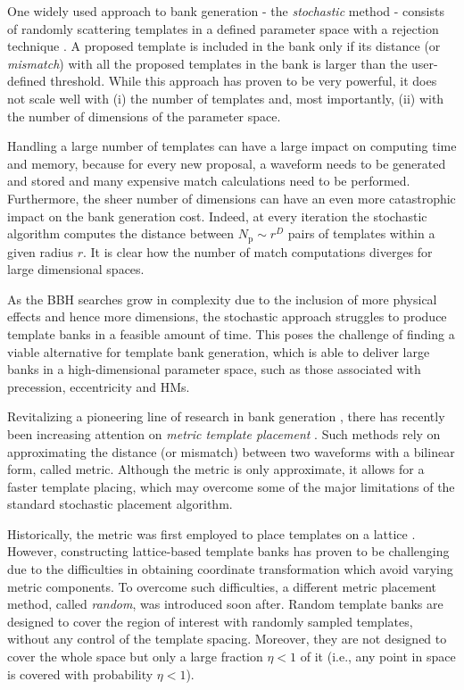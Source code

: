 \documentclass[twocolumn,showpacs,preprintnumbers,nofootinbib,prd,
superscriptaddress,10pt]{revtex4-2}
\begin{document}
One widely used approach to bank generation - the {\it stochastic} method \cite{Harry:2009ea, PhysRevD.80.104014, Ajith:2012mn} - consists of randomly scattering templates in a defined parameter space with a rejection technique \cite{DalCanton:2017ala, Mukherjee:2018yra, Indik:2016qky, Lenon:2021zac}. A proposed template is included in the bank only if its distance (or {\it mismatch}) with all the proposed templates in the bank is larger than the user-defined threshold.
While this approach has proven to be very powerful, it does not scale well with (i) the number of templates and, most importantly, (ii) with the number of dimensions of the parameter space.

Handling a large number of templates can have a large impact on computing time and memory, because for every new proposal, a waveform needs to be generated and stored and many expensive match calculations need to be performed.
Furthermore, the sheer number of dimensions can have an even more catastrophic impact on the bank generation cost. Indeed, at every iteration the stochastic algorithm computes the distance between $N_\text{p}\sim r^D$ pairs of templates within a given radius $r$. It is clear how the number of match computations diverges for large dimensional spaces.

As the BBH searches grow in complexity due to the inclusion of more physical effects and hence more dimensions, the stochastic approach struggles to produce template banks in a feasible amount of time.
This poses the challenge of finding a viable alternative for template bank generation, which is able to deliver large banks in a high-dimensional parameter space, such as those associated with precession, eccentricity and HMs.

Revitalizing a pioneering line of research in bank generation \cite{owen_metric, Messenger:2008ta, Prix:2007ks, Brown:2012qf, Keppel:2013uma}, there has recently been increasing attention on {\it metric template placement} \cite{Roy:2017oul, 2018cosp...42E2899R, Coogan:2022qxs, Hanna:2022zpk}.
Such methods rely on approximating the distance (or mismatch) between two waveforms with a bilinear form, called metric.
Although the metric is only approximate, it allows for a faster template placing, which may overcome some of the major limitations of the standard stochastic placement algorithm.

Historically, the metric was first employed to place templates on a lattice \cite{owen_metric, Prix:2007ks, Cokelaer:2007kx}. However, constructing lattice-based template banks has proven to be challenging due to the difficulties in  obtaining coordinate transformation which avoid varying metric components.
To overcome such difficulties, a different metric placement method, called {\it random}, was introduced \cite{Messenger:2008ta} soon after.
Random template banks are designed to cover the region of interest with randomly sampled templates, without any control of the template spacing. 
Moreover, they are not designed to cover the whole space but only a large fraction $\eta<1$ of it (i.e., any point in space is covered with probability $\eta<1$).
\end{document}

